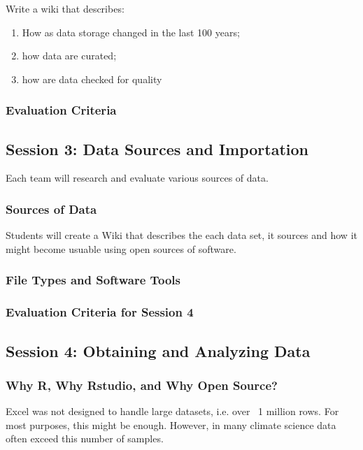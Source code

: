 \documentclass{article}\usepackage[]{graphicx}\usepackage[]{color}
\begin{document}
Write a wiki that describes: 

\begin{enumerate}
  \item How as data storage changed in the last 100 years;
  \item how data are curated; 
  \item how are data checked for quality
\end{enumerate}

\subsubsection{Evaluation Criteria}


\subsection{Session 3: Data Sources and Importation}

Each team will research and evaluate various sources of data.

\subsubsection{Sources of Data}

Students will create a Wiki that describes the each data set, it sources and how it might become usuable using open sources of software.

\subsubsection{File Types and Software Tools}

\subsubsection{Evaluation Criteria for Session 4}


\subsection{Session 4: Obtaining and Analyzing Data}

\subsubsection{Why R, Why Rstudio, and Why Open Source?}

Excel was not designed to handle large datasets, i.e. over ~1 million rows. For most purposes, this might be enough. However, in many climate science data often exceed this number of samples.
\end{document}
